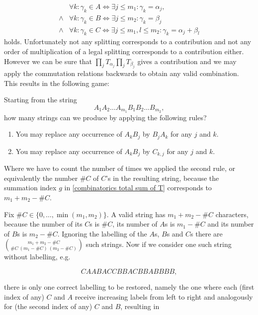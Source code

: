 \documentclass[b5paper,draft,openbib,12pt]{memoir}
\begin{document}
\begin{align*}
&\forall k: \gamma_k \in A \iff \exists j\le m_1: \gamma_k = \alpha_j, \\
\wedge& \forall k: \gamma_k \in B \iff \exists j\le m_2: \gamma_k = \beta_j\\
\wedge & \forall k: \gamma_k \in C \iff \exists j\le m_1, l\le m_2: \gamma_k = \alpha_j + \beta_l
\end{align*}
 holds. Unfortunately not any splitting corresponds to a contribution and not any
 order of multiplication of a legal splitting corresponds to a contribution either.
 However we can be sure that \(\prod_{j} T_{\alpha_j} \prod_j T_{\beta_j}\) gives
 a contribution and we may apply the commutation relations backwards to obtain any
 valid combination. This results in the following game:
 
Starting from the string 
\begin{equation}
A_1A_2\dots A_{m_1} B_1 B_2 \dots B_{m_2},
\end{equation}
how many strings can we produce by applying the following rules?
\begin{enumerate}
\item You may replace any occurrence of \(A_k B_j\) by \(B_j A_k\) for any \(j\) and \(k\).
\item You may replace any occurrence of \(A_k B_j\) by \(C_{k,j}\) for any \(j\) and \(k\).
\end{enumerate}
Where we have to count the number of times we applied the second rule, or equivalently
the number \(\#C\) of \(C\)'s in the resulting string, because the summation index \(g\) in 
\eqref{combinatorics total sum of T} corresponds to \(m_1+m_2-\#C\). 

Fix \(\#C \in\{0,\dots ,\min(m_1,m_2)\}\). A valid string has \(m_1+m_2-\#C\) characters,
because the number of its \(C\)s is \(\#C\), its number of \(A\)s is \(m_1-\#C\) and 
its number of \(B\)s is \(m_2-\#C\). Ignoring the labelling of the \(A\)s, \(B\)s and \(C\)s 
there are \(\binom{m_1+m_2-\#C}{\#C \ (m_1 - \#C) \ (m_2-\#C)}\) such strings. Now if
we consider one such string without labelling, e.g.

\begin{equation}
C A A B A C C B B A C B B A B B B B,
\end{equation}

there is only one correct labelling to be restored, namely the one where each (first index of 
any) \(C\) and \(A\) receive increasing labels from left to right and analogously for (the second 
 index of any) \(C\) and \(B\), resulting in
 
\end{document}
